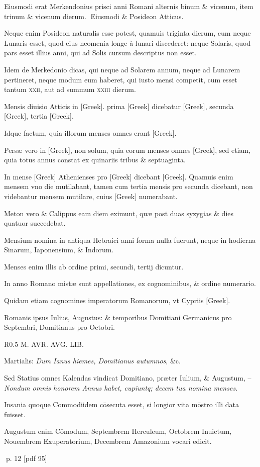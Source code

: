 \begin{parnumbers}

Eiusmodi erat Merkendonius  prisci anni Romani alternis binum \& vicenum, item trinum \& vicenum dierum.
Eiusmodi \& Posideon Atticus.

Neque enim Posideon naturalis esse potest, quamuis triginta dierum, cum neque Lunaris esset, quod eius neomenia longe à lunari discederet: neque Solaris, quod pars esset illius anni, qui ad Solis cursum descriptus non esset.

Idem de Merkedonio dicas, qui neque ad Solarem annum, neque ad Lunarem pertineret, neque modum eum haberet, qui iusto mensi competit, cum esset tantum \textsc{xxii}, aut ad summum \textsc{xxiii} dierum.

Mensis diuisio Atticis in \textgreek{[Greek]}. prima \textgreek{[Greek]} dicebatur \textgreek{[Greek]}, secunda \textgreek{[Greek]}, tertia \textgreek{[Greek]}.

Idque factum, quia illorum menses omnes erant \textgreek{[Greek]}.

Persæ vero in \textgreek{[Greek]},  non solum, quia eorum menses omnes \textgreek{[Greek]}, sed etiam, quia totus annus constat ex quinariis tribus \& septuaginta.

In mense \textgreek{[Greek]} Athenienses pro \textgreek{[Greek]} dicebant \textgreek{[Greek]}. Quamuis enim mensem vno die mutilabant, tamen cum tertia mensis pro secunda dicebant, non videbantur mensem mutilare, cuius \textgreek{[Greek]} numerabant.

Meton vero \& Calippus eam diem eximunt, quæ post duas syzygias \& dies quatuor succedebat.

Mensium nomina in antiqua Hebraici anni forma nulla fuerunt, neque in hodierna Sinarum, Iaponensium, \& Indorum.

Menses enim illis ab ordine primi, secundi, tertij dicuntur.

In anno Romano mistæ sunt appellationes, ex cognominibus, \& ordine numerario.

Quidam etiam cognomines imperatorum Romanorum, vt Cypriis \textgreek{[Greek]}.

Romanis ipsus Iulius, Augustus: \& temporibus Domitiani Germanicus pro Septembri, Domitianus pro Octobri.

\begin{wrapfigure}[16]{R}{0.5\textwidth}
  \centering
  {M. AVR. AVG. LIB.}
\end{wrapfigure}

Martialis: \textit{Dum Ianus hiemes, Domitianus autumnos}, \&c.

Sed Statius omnes Kalendas vindicat Domitiano, præter Iulium, \& Augustum, – \textit{Nondum omnis honorem Annus habet, cupiuntq; decem tua nomina menses.}

Insania quoque Commodiidem cōsecuta esset, si  longior vita mōstro illi data fuisset.

Augustum enim Cōmodum, Septembrem Herculeum, Octobrem Inuictum, Nouembrem Exuperatorium, Decembrem Amazonium vocari edicit.

\end{parnumbers}
\clearpage
p. 12 [pdf 95]

